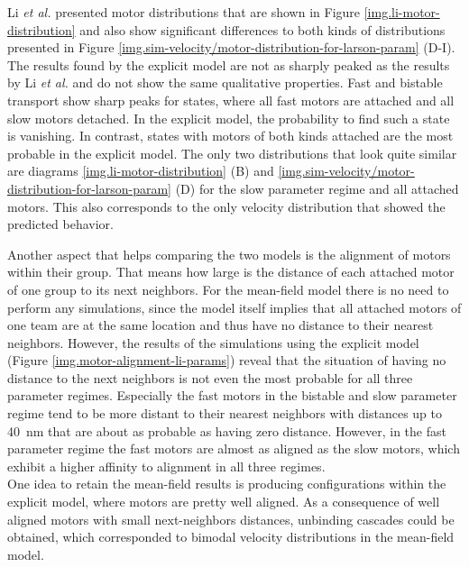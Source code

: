 Li \textit{et al.} \cite{li} presented motor distributions that are shown in Figure \ref{img.li-motor-distribution} and also show significant differences to both kinds of distributions presented in Figure
\ref{img.sim-velocity/motor-distribution-for-larson-param} (D-I). The results found by the explicit model are not as sharply peaked as the results by Li \textit{et al.} \cite{li} and do not show the
same qualitative properties. Fast and bistable transport show sharp peaks for states, where all fast motors are attached and all slow motors detached. In the explicit model, the probability to
find such a state is vanishing. In contrast, states with motors of both kinds attached are the most probable in the explicit model. The only two distributions that look quite similar are diagrams
\ref{img.li-motor-distribution} (B) and \ref{img.sim-velocity/motor-distribution-for-larson-param} (D) for the slow parameter regime and all attached motors. This also corresponds to the only
velocity distribution that showed the predicted behavior.


Another aspect that helps comparing the two models is the alignment of motors within their group. That means how large is the distance of each attached motor of one group to its next neighbors.
For the mean-field model there is no need to perform any simulations, since the model itself implies that all attached motors of one team are at the same location and thus have no distance to their
nearest neighbors. However, the results of the simulations using the explicit model (Figure \ref{img.motor-alignment-li-params}) reveal that the situation of having no distance to the next
neighbors is not even the most probable for all three parameter regimes. Especially the fast motors in the bistable and slow parameter regime tend to be more distant to their nearest neighbors
with distances up to \SI{40}{\nano\metre} that are about as probable as having zero distance. However, in the fast parameter regime the fast motors are almost as aligned as the slow motors, which
exhibit a higher affinity to alignment in all three regimes. \\
One idea to retain the mean-field results is producing configurations within the explicit model, where motors are pretty well aligned. As a consequence of well aligned motors with small
next-neighbors distances, unbinding cascades could be obtained, which corresponded to bimodal velocity distributions in the mean-field model.

